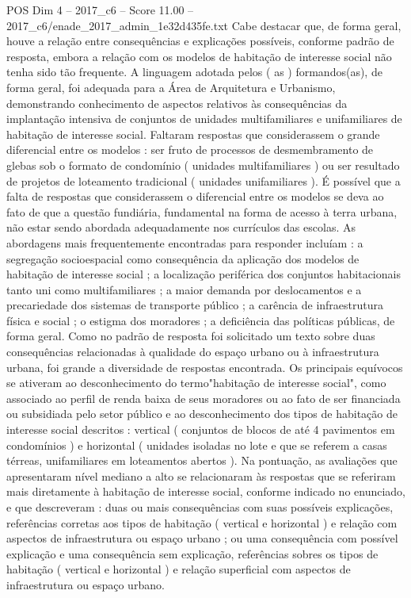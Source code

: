 \begin{textsample}{POS Dim 4 – 2017\_c6 – Score 11.00 – 2017\_c6/enade\_2017\_admin\_1e32d435fe.txt}
Cabe destacar que, de forma geral, houve a relação entre consequências e explicações possíveis, conforme padrão de resposta, embora a relação com os modelos de habitação de interesse social não tenha sido tão frequente.
A linguagem adotada pelos ( as ) formandos(as), de forma geral, foi adequada para a Área de Arquitetura e Urbanismo, demonstrando conhecimento de aspectos relativos às consequências da implantação intensiva de conjuntos de unidades multifamiliares e unifamiliares de habitação de interesse social.
Faltaram respostas que considerassem o grande diferencial entre os modelos : ser fruto de processos de desmembramento de glebas sob o formato de condomínio ( unidades multifamiliares ) ou ser resultado de projetos de loteamento tradicional ( unidades unifamiliares ).
É possível que a falta de respostas que considerassem o diferencial entre os modelos se deva ao fato de que a questão fundiária, fundamental na forma de acesso à terra urbana, não estar sendo abordada adequadamente nos currículos das escolas.
As abordagens mais frequentemente encontradas para responder incluíam : a segregação socioespacial como consequência da aplicação dos modelos de habitação de interesse social ; a localização periférica dos conjuntos habitacionais tanto uni como multifamiliares ; a maior demanda por deslocamentos e a precariedade dos sistemas de transporte público ; a carência de infraestrutura física e social ; o estigma dos moradores ; a deficiência das políticas públicas, de forma geral.
Como no padrão de resposta foi solicitado um texto sobre duas consequências relacionadas à qualidade do espaço urbano ou à infraestrutura urbana, foi grande a diversidade de respostas encontrada.
Os principais equívocos se ativeram ao desconhecimento do termo"habitação de interesse social", como associado ao perfil de renda baixa de seus moradores ou ao fato de ser financiada ou subsidiada pelo setor público e ao desconhecimento dos tipos de habitação de interesse social descritos : vertical ( conjuntos de blocos de até 4 pavimentos em condomínios ) e horizontal ( unidades isoladas no lote e que se referem a casas térreas, unifamiliares em loteamentos abertos ).
Na pontuação, as avaliações que apresentaram nível mediano a alto se relacionaram às respostas que se referiram mais diretamente à habitação de interesse social, conforme indicado no enunciado, e que descreveram : duas ou mais consequências com suas possíveis explicações, referências corretas aos tipos de habitação ( vertical e horizontal ) e relação com aspectos de infraestrutura ou espaço urbano ; ou uma consequência com possível explicação e uma consequência sem explicação, referências sobres os tipos de habitação ( vertical e horizontal ) e relação superficial com aspectos de infraestrutura ou espaço urbano.

\end{textsample}
